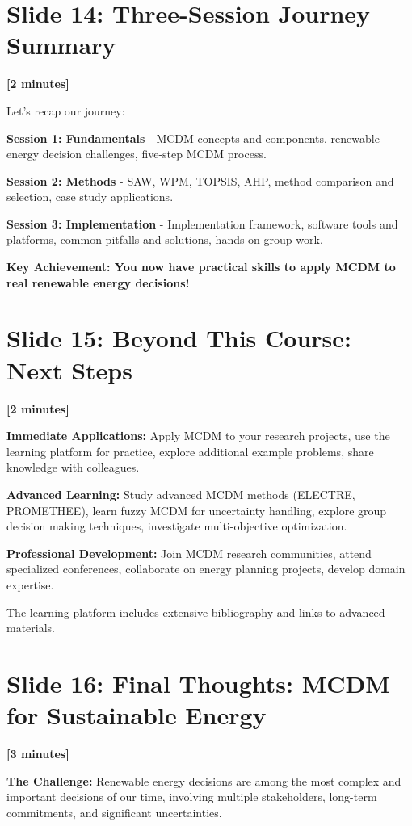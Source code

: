 \documentclass[12pt]{article}
\begin{document}
\section*{Slide 14: Three-Session Journey Summary}
\textcolor{timing}{\textbf{[2 minutes]}}

Let's recap our journey:

\textcolor{emphasis}{\textbf{Session 1: Fundamentals}} - MCDM concepts and components, renewable energy decision challenges, five-step MCDM process.

\textcolor{emphasis}{\textbf{Session 2: Methods}} - SAW, WPM, TOPSIS, AHP, method comparison and selection, case study applications.

\textcolor{emphasis}{\textbf{Session 3: Implementation}} - Implementation framework, software tools and platforms, common pitfalls and solutions, hands-on group work.

\textcolor{emphasis}{\textbf{Key Achievement: You now have practical skills to apply MCDM to real renewable energy decisions!}}

\section*{Slide 15: Beyond This Course: Next Steps}
\textcolor{timing}{\textbf{[2 minutes]}}

\textcolor{emphasis}{\textbf{Immediate Applications:}} Apply MCDM to your research projects, use the learning platform for practice, explore additional example problems, share knowledge with colleagues.

\textcolor{emphasis}{\textbf{Advanced Learning:}} Study advanced MCDM methods (ELECTRE, PROMETHEE), learn fuzzy MCDM for uncertainty handling, explore group decision making techniques, investigate multi-objective optimization.

\textcolor{emphasis}{\textbf{Professional Development:}} Join MCDM research communities, attend specialized conferences, collaborate on energy planning projects, develop domain expertise.

The learning platform includes extensive bibliography and links to advanced materials.

\section*{Slide 16: Final Thoughts: MCDM for Sustainable Energy}
\textcolor{timing}{\textbf{[3 minutes]}}

\textcolor{emphasis}{\textbf{The Challenge:}} Renewable energy decisions are among the most complex and important decisions of our time, involving multiple stakeholders, long-term commitments, and significant uncertainties.
\end{document}

